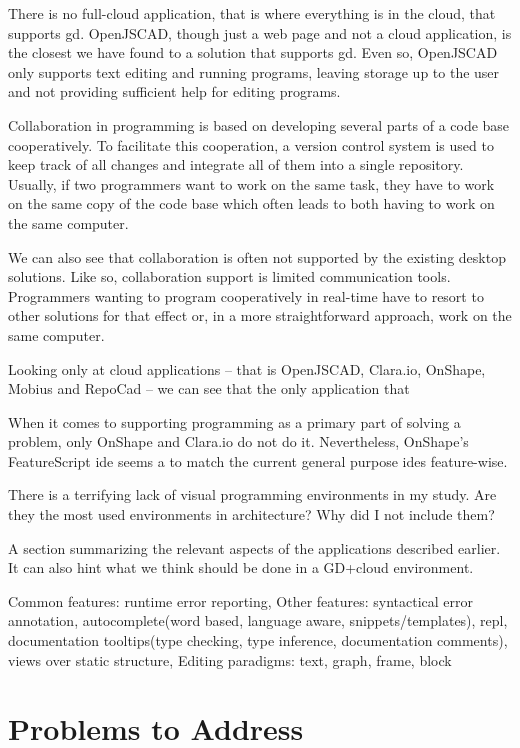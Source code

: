 There is no full-cloud application, that is where everything is in the cloud, that supports \gls{gd}.
OpenJSCAD, though just a web page and not a cloud application, is the closest we have found to a solution that supports \gls{gd}.
Even so, OpenJSCAD only supports text editing and running programs, leaving storage up to the user and not providing sufficient help for editing programs.


Collaboration in programming is based on developing several parts of a code base cooperatively.
To facilitate this cooperation, a version control system is used to keep track of all changes and integrate all of them into a single repository.
Usually, if two programmers want to work on the same task, they have to work on the same copy of the code base which often leads to both having to work on the same computer.

We can also see that collaboration is often not supported by the existing desktop solutions.
Like so, collaboration support is limited communication tools.
Programmers wanting to program cooperatively in real-time have to resort to other solutions for that effect or, in a more straightforward approach, work on the same computer.


Looking only at cloud applications -- that is OpenJSCAD, Clara.io, OnShape, Mobius and RepoCad -- we can see that the only application that


When it comes to supporting programming as a primary part of solving a problem, only OnShape and Clara.io do not do it.
Nevertheless, OnShape's FeatureScript \gls{ide} seems a to match the current general purpose \glspl{ide} feature-wise.

\noindent{\rule{\textwidth}{0.4pt}}

There is a terrifying lack of visual programming environments in my study.
Are they the most used environments in architecture?
Why did I not include them?

A section summarizing the relevant aspects of the applications described earlier.
It can also hint what we think should be done in a GD+cloud environment.

Common features: runtime error reporting,
Other features: syntactical error annotation, autocomplete(word based, language aware, snippets/templates), repl, documentation tooltips(type checking, type inference, documentation comments), views over static structure,
Editing paradigms: text, graph, frame, block

\section{Problems to Address}



